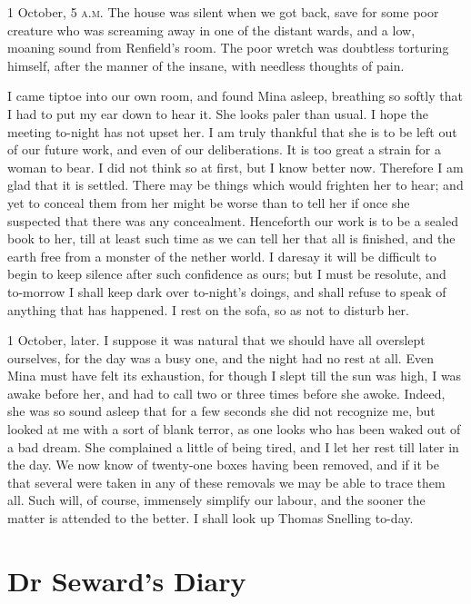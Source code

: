 \begin{diary}{1 October, 5 \textsc{a.m.}}
The house was silent when we got back, save for some poor creature who was screaming away in one of the distant wards, and a low, moaning sound from Renfield's room. The poor wretch was doubtless torturing himself, after the manner of the insane, with needless thoughts of pain.

I came tiptoe into our own room, and found Mina asleep, breathing so softly that I had to put my ear down to hear it. She looks paler than usual. I hope the meeting to-night has not upset her. I am truly thankful that she is to be left out of our future work, and even of our deliberations. It is too great a strain for a woman to bear. I did not think so at first, but I know better now. Therefore I am glad that it is settled. There may be things which would frighten her to hear; and yet to conceal them from her might be worse than to tell her if once she suspected that there was any concealment. Henceforth our work is to be a sealed book to her, till at least such time as we can tell her that all is finished, and the earth free from a monster of the nether world. I daresay it will be difficult to begin to keep silence after such confidence as ours; but I must be resolute, and to-morrow I shall keep dark over to-night's doings, and shall refuse to speak of anything that has happened. I rest on the sofa, so as not to disturb her.
\end{diary}
 

\begin{diary}{1 October, later.}
I suppose it was natural that we should have all overslept ourselves, for the day was a busy one, and the night had no rest at all. Even Mina must have felt its exhaustion, for though I slept till the sun was high, I was awake before her, and had to call two or three times before she awoke. Indeed, she was so sound asleep that for a few seconds she did not recognize me, but looked at me with a sort of blank terror, as one looks who has been waked out of a bad dream. She complained a little of being tired, and I let her rest till later in the day. We now know of twenty-one boxes having been removed, and if it be that several were taken in any of these removals we may be able to trace them all. Such will, of course, immensely simplify our labour, and the sooner the matter is attended to the better. I shall look up Thomas Snelling to-day.
	\end{diary}

\section{Dr Seward's Diary}

